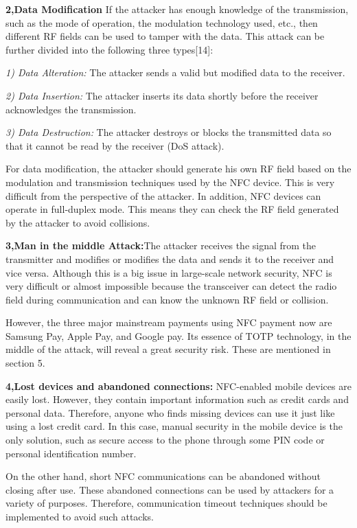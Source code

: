 \documentclass[journal]{IEEEtran}
\begin{document}
\textbf{2,Data Modification}
If the attacker has enough knowledge of the transmission, such as the mode of operation, the modulation technology used, etc., then different RF fields can be used to tamper with the data. This attack can be further divided into the following three types[14]:

\textit{1) Data Alteration:} The attacker sends a valid but modified data to the receiver.

\textit{2) Data Insertion:} The attacker inserts its data shortly before the receiver acknowledges the transmission.

\textit{3) Data Destruction:} The attacker destroys or blocks the transmitted data so that it cannot be read by the receiver (DoS attack).

For data modification, the attacker should generate his own RF field based on the modulation and transmission techniques used by the NFC device. This is very difficult from the perspective of the attacker. In addition, NFC devices can operate in full-duplex mode. This means they can check the RF field generated by the attacker to avoid collisions.

\textbf{3,Man in the middle Attack:}The attacker receives the signal from the transmitter and modifies or modifies the data and sends it to the receiver and vice versa. Although this is a big issue in large-scale network security, NFC is very difficult or almost impossible because the transceiver can detect the radio field during communication and can know the unknown RF field or collision.

However, the three major mainstream payments using NFC payment now are Samsung Pay, Apple Pay, and Google pay. Its essence of TOTP technology, in the middle of the attack, will reveal a great security risk. These are mentioned in section 5.

\textbf{4,Lost devices and abandoned connections:}
NFC-enabled mobile devices are easily lost. However, they contain important information such as credit cards and personal data. Therefore, anyone who finds missing devices can use it just like using a lost credit card. In this case, manual security in the mobile device is the only solution, such as secure access to the phone through some PIN code or personal identification number.

On the other hand, short NFC communications can be abandoned without closing after use. These abandoned connections can be used by attackers for a variety of purposes. Therefore, communication timeout techniques should be implemented to avoid such attacks.
\end{document}
